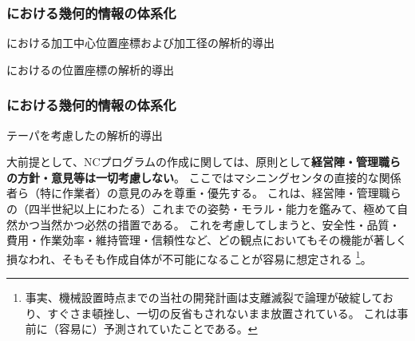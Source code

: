 \subsubsection{\CurvedOutcutMilling における幾何的情報の体系化}
\begin{enumerate}[label={\sarrow[red]}]
\item[\sarrow] \CurvedOutcut における加工中心位置座標および加工径の解析的導出
\item[\sarrow] \CurvedOutcut における\EndFace の位置座標の解析的導出
\end{enumerate}

\subsubsection{\InnerDiameter における幾何的情報の体系化}
\begin{enumerate}[label={\sarrow[red]}]
\item[\sarrow] テーパを考慮した\InnerDiameter の解析的導出
\end{enumerate}



\clearpage
\begin{marker}
大前提として、NCプログラムの作成に関しては、原則として\textbf{経営陣・管理職らの方針・意見等は一切考慮しない}。
ここではマシニングセンタの直接的な関係者ら（特に作業者）の意見のみを尊重・優先する。
\tcbline*
これは、経営陣・管理職らの（四半世紀以上にわたる）これまでの姿勢・モラル・能力を鑑みて、極めて自然かつ当然かつ必然の措置である。
これを考慮してしまうと、安全性・品質・費用・作業効率・維持管理・信頼性など、どの観点においてもその機能が著しく損なわれ、そもそも作成自体が不可能になることが容易に想定される
\footnote{事実、機械設置時点までの当社の開発計画は支離滅裂で論理が破綻しており、すぐさま頓挫し、一切の反省もされないまま放置されている。
これは事前に（容易に）予測されていたことである。}。
\end{marker}


